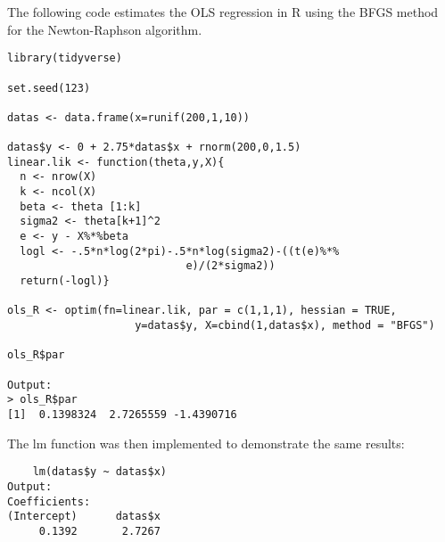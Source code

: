 \documentclass[12pt,letterpaper]{article}
\begin{document}
\item The following code estimates the OLS regression in R using the BFGS method for the Newton-Raphson algorithm.


\begin{verbatim}
library(tidyverse) 

set.seed(123)

datas <- data.frame(x=runif(200,1,10))

datas$y <- 0 + 2.75*datas$x + rnorm(200,0,1.5)
linear.lik <- function(theta,y,X){
  n <- nrow(X)
  k <- ncol(X)
  beta <- theta [1:k]
  sigma2 <- theta[k+1]^2
  e <- y - X%*%beta
  logl <- -.5*n*log(2*pi)-.5*n*log(sigma2)-((t(e)%*%
                            e)/(2*sigma2))
  return(-logl)}

ols_R <- optim(fn=linear.lik, par = c(1,1,1), hessian = TRUE,
                    y=datas$y, X=cbind(1,datas$x), method = "BFGS")

ols_R$par

Output:
> ols_R$par
[1]  0.1398324  2.7265559 -1.4390716

\end{verbatim}
The lm function was then implemented to demonstrate the same results:

\begin{verbatim}
    lm(datas$y ~ datas$x)
Output:
Coefficients:
(Intercept)      datas$x  
     0.1392       2.7267
     
\end{verbatim}
\end{document}
